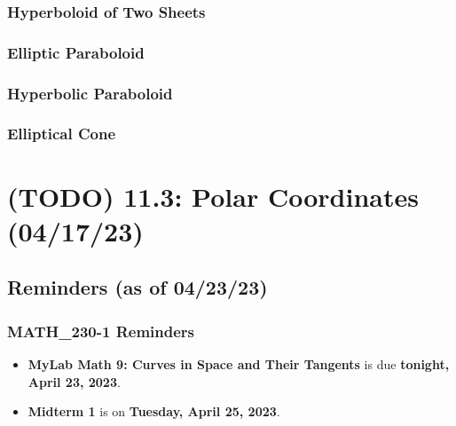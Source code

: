 \documentclass{report}
\begin{document}
\begin{sloppypar}
\subsection{Hyperboloid of Two Sheets}
\begin{center}
\end{center}
\subsection{Elliptic Paraboloid}
\begin{center}
\end{center}
\subsection{Hyperbolic Paraboloid}
\begin{center}
\end{center}
\subsection{Elliptical Cone}
\begin{center}
\end{center}

\chapter{(TODO) 11.3: Polar Coordinates (04/17/23)}
\section{Reminders (as of 04/23/23)}
\subsection{MATH\_230-1 Reminders}
\begin{itemize}
  \item \textbf{MyLab Math 9: Curves in Space and Their
        Tangents} is due \textbf{tonight, April 23, 2023}.
  \item \textbf{Midterm 1} is on \textbf{Tuesday, April
        25, 2023}.


\end{itemize}
\end{sloppypar}
\end{document}
